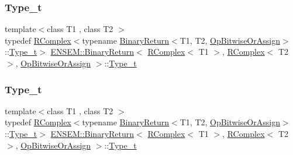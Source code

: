 \subsubsection{\texorpdfstring{Type\_t}{Type\_t}\hspace{0.1cm}{\footnotesize\ttfamily [1/2]}}
{\footnotesize\ttfamily template$<$class T1 , class T2 $>$ \\
typedef \mbox{\hyperlink{classENSEM_1_1RComplex}{R\+Complex}}$<$typename \mbox{\hyperlink{structENSEM_1_1BinaryReturn}{Binary\+Return}}$<$T1, T2, \mbox{\hyperlink{structENSEM_1_1OpBitwiseOrAssign}{Op\+Bitwise\+Or\+Assign}}$>$\+::\mbox{\hyperlink{structENSEM_1_1BinaryReturn_3_01RComplex_3_01T1_01_4_00_01RComplex_3_01T2_01_4_00_01OpBitwiseOrAssign_01_4_afc125f612f2e10cb2ab894e459a7f90a}{Type\+\_\+t}}$>$ \mbox{\hyperlink{structENSEM_1_1BinaryReturn}{E\+N\+S\+E\+M\+::\+Binary\+Return}}$<$ \mbox{\hyperlink{classENSEM_1_1RComplex}{R\+Complex}}$<$ T1 $>$, \mbox{\hyperlink{classENSEM_1_1RComplex}{R\+Complex}}$<$ T2 $>$, \mbox{\hyperlink{structENSEM_1_1OpBitwiseOrAssign}{Op\+Bitwise\+Or\+Assign}} $>$\+::\mbox{\hyperlink{structENSEM_1_1BinaryReturn_3_01RComplex_3_01T1_01_4_00_01RComplex_3_01T2_01_4_00_01OpBitwiseOrAssign_01_4_afc125f612f2e10cb2ab894e459a7f90a}{Type\+\_\+t}}}

\mbox{\label{structENSEM_1_1BinaryReturn_3_01RComplex_3_01T1_01_4_00_01RComplex_3_01T2_01_4_00_01OpBitwiseOrAssign_01_4_afc125f612f2e10cb2ab894e459a7f90a}} 
\subsubsection{\texorpdfstring{Type\_t}{Type\_t}\hspace{0.1cm}{\footnotesize\ttfamily [2/2]}}
{\footnotesize\ttfamily template$<$class T1 , class T2 $>$ \\
typedef \mbox{\hyperlink{classENSEM_1_1RComplex}{R\+Complex}}$<$typename \mbox{\hyperlink{structENSEM_1_1BinaryReturn}{Binary\+Return}}$<$T1, T2, \mbox{\hyperlink{structENSEM_1_1OpBitwiseOrAssign}{Op\+Bitwise\+Or\+Assign}}$>$\+::\mbox{\hyperlink{structENSEM_1_1BinaryReturn_3_01RComplex_3_01T1_01_4_00_01RComplex_3_01T2_01_4_00_01OpBitwiseOrAssign_01_4_afc125f612f2e10cb2ab894e459a7f90a}{Type\+\_\+t}}$>$ \mbox{\hyperlink{structENSEM_1_1BinaryReturn}{E\+N\+S\+E\+M\+::\+Binary\+Return}}$<$ \mbox{\hyperlink{classENSEM_1_1RComplex}{R\+Complex}}$<$ T1 $>$, \mbox{\hyperlink{classENSEM_1_1RComplex}{R\+Complex}}$<$ T2 $>$, \mbox{\hyperlink{structENSEM_1_1OpBitwiseOrAssign}{Op\+Bitwise\+Or\+Assign}} $>$\+::\mbox{\hyperlink{structENSEM_1_1BinaryReturn_3_01RComplex_3_01T1_01_4_00_01RComplex_3_01T2_01_4_00_01OpBitwiseOrAssign_01_4_afc125f612f2e10cb2ab894e459a7f90a}{Type\+\_\+t}}}



